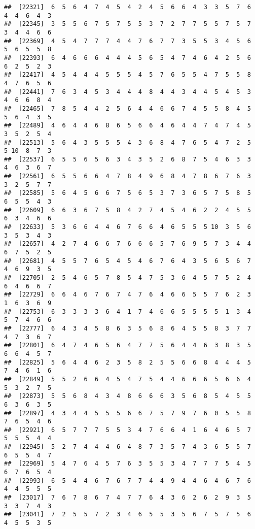 \documentclass[
]{book}
\begin{document}
\begin{verbatim}
##  [22321]  6  5  6  4  7  4  5  4  2  4  5  6  6  4  3  3  5  7  6  4  4  6  4  3
##  [22345]  3  5  5  6  7  5  7  5  5  3  7  2  7  7  5  5  7  5  7  3  4  4  6  6
##  [22369]  4  5  4  7  7  7  4  4  7  6  7  7  3  5  5  3  4  5  6  5  6  5  5  8
##  [22393]  6  4  6  6  6  4  4  4  5  6  5  4  7  4  6  4  2  5  6  6  2  5  2  3
##  [22417]  4  5  4  4  4  5  5  5  4  5  7  6  5  5  4  7  5  5  8  4  7  6  5  6
##  [22441]  7  6  3  4  5  3  4  4  4  8  4  4  3  4  4  5  4  5  3  4  6  6  8  4
##  [22465]  7  8  5  4  4  2  5  6  4  4  6  6  7  4  5  5  8  4  5  5  6  4  3  5
##  [22489]  4  6  4  4  6  8  6  5  6  6  4  6  4  4  7  4  7  4  5  3  5  2  5  4
##  [22513]  5  6  4  3  5  5  5  4  3  6  8  4  7  6  5  4  7  2  5  5 10  8  7  3
##  [22537]  6  5  5  6  5  6  3  4  3  5  2  6  8  7  5  4  6  3  3  4  6  3  6  7
##  [22561]  6  5  5  6  6  4  7  8  4  9  6  8  4  7  8  6  7  6  3  3  2  5  7  7
##  [22585]  5  6  4  5  6  6  7  5  6  5  3  7  3  6  5  7  5  8  5  6  5  5  4  3
##  [22609]  6  6  3  6  7  5  8  4  2  7  4  5  4  6  2  2  4  5  5  6  3  4  6  6
##  [22633]  5  3  6  6  4  4  6  7  6  6  4  6  5  5  5 10  3  5  6  3  5  3  4  3
##  [22657]  4  2  7  4  6  6  7  6  6  6  5  7  6  9  5  7  3  4  4  6  7  5  2  5
##  [22681]  4  5  5  7  6  5  4  5  4  6  7  6  4  3  5  6  5  6  7  4  6  9  3  5
##  [22705]  2  5  4  6  5  7  8  5  4  7  5  3  6  4  5  7  5  2  4  6  4  6  6  7
##  [22729]  6  6  4  6  7  6  7  4  7  6  4  6  6  5  5  7  6  2  3  1  6  3  6  9
##  [22753]  6  3  3  3  3  6  4  1  7  4  6  6  5  5  5  5  1  3  4  5  7  4  6  6
##  [22777]  6  4  3  4  5  8  6  3  5  6  8  6  4  5  5  8  3  7  7  4  7  3  6  7
##  [22801]  6  4  7  4  6  5  6  4  7  7  5  6  4  4  6  3  8  3  5  6  6  4  5  7
##  [22825]  5  6  4  4  6  2  3  5  8  2  5  5  6  6  8  4  4  4  5  7  4  6  1  6
##  [22849]  5  5  2  6  6  4  5  4  7  5  4  4  6  6  6  5  6  6  4  5  3  2  7  5
##  [22873]  5  5  6  8  4  3  4  8  6  6  6  3  5  6  8  5  4  5  5  6  3  6  3  5
##  [22897]  4  3  4  4  5  5  5  6  6  7  5  7  9  7  6  0  5  5  8  7  6  5  4  6
##  [22921]  6  5  7  7  7  5  5  3  4  7  6  6  4  1  6  4  6  5  7  5  5  5  4  4
##  [22945]  5  2  7  4  4  4  6  4  8  7  3  5  7  4  3  6  5  5  7  6  5  5  4  7
##  [22969]  5  4  7  6  4  5  7  6  3  5  5  3  4  7  7  7  5  4  5  6  7  6  5  4
##  [22993]  6  5  4  4  6  7  6  7  7  4  4  9  4  4  6  4  6  7  6  4  4  5  5  5
##  [23017]  7  6  7  8  6  7  4  7  7  6  4  3  6  2  6  2  9  3  5  3  3  7  4  3
##  [23041]  7  2  5  5  7  2  3  4  6  5  5  3  5  6  7  5  7  5  6  4  5  5  3  5

\end{verbatim}
\end{document}
